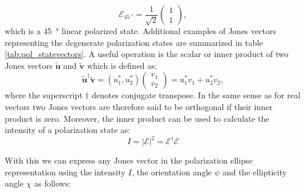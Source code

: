 \begin{equation}
    \bm{\mathcal{E}}_{\SI{45}{\degree}}= \frac{1}{\sqrt{2}}
    \begin{pmatrix}
    1 \\
    1
    \end{pmatrix},
\end{equation}
which is a \SI{45}{\degree} linear polarized state. Additional examples of Jones vectors representing the degenerate polarization states are summarized in table \ref{tab:pol_statevectors}. A useful operation is the scalar or inner product of two Jones vectors $\bm{\tilde{u}}$ and $\bm{\tilde{v}}$ which is defined as:
\begin{equation}
    \bm{\tilde{u}}^{\dagger}\bm{\tilde{v}} = \left(u_1^{*}, u_2^{*} \right)
    \begin{pmatrix}
    v_1 \\
    v_2
    \end{pmatrix}
    = u_1^{*}v_1 + u_2^{*}v_2,
\end{equation}
where the superscript $\dagger$ denotes conjugate transpose. In the same sense as for real vectors two Jones vectors are therefore said to be orthogonal if their inner product is zero. Moreover, the inner product can be used to calculate the intensity of a polarization state as:
\begin{equation}
    I=|\bm{\mathcal{E}}|^2=\bm{\mathcal{E}}^{\dagger}\bm{\mathcal{E}}
\end{equation}

With this we can express any Jones vector in the polarization ellipse representation using the intensity $I$, the orientation angle $\psi$ and the ellipticity angle $\chi$ as follows:

